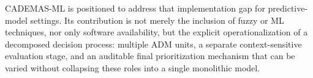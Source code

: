 CADEMAS-ML is positioned to address that implementation gap for predictive-model settings. Its contribution is not merely the inclusion of fuzzy or ML techniques, nor only software availability, but the explicit operationalization of a decomposed decision process: multiple ADM units, a separate context-sensitive evaluation stage, and an auditable final prioritization mechanism that can be varied without collapsing these roles into a single monolithic model.